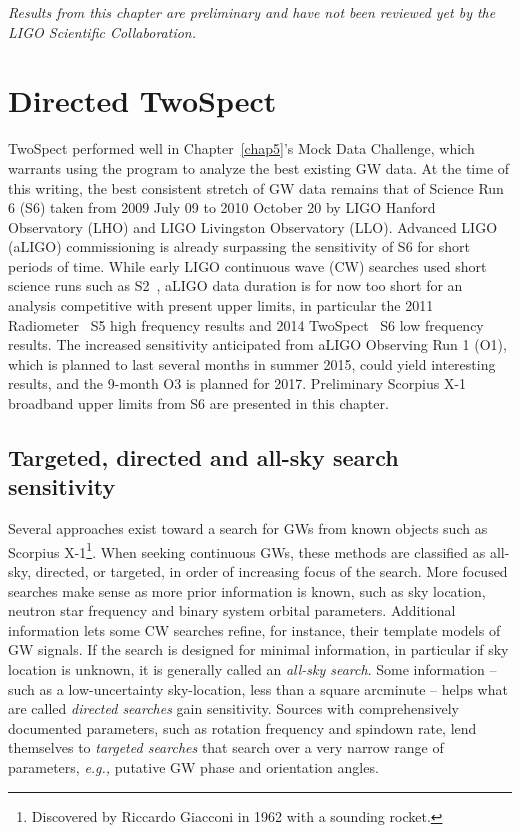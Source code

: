 
\textit{Results from this chapter are preliminary and have not been reviewed yet by the LIGO Scientific Collaboration.}

        \section{Directed TwoSpect}
        \label{directed}

TwoSpect performed well in Chapter~\ref{chap5}'s Mock Data Challenge, which warrants using the program to analyze the best existing GW data.
At the time of this writing, the best consistent stretch of GW data remains that of Science Run 6 (S6) taken from 2009 July 09 to 2010 October 20 by LIGO Hanford Observatory (LHO) and LIGO Livingston Observatory (LLO).
Advanced LIGO (aLIGO) commissioning is already surpassing the sensitivity of S6 for short periods of time.
While early LIGO continuous wave (CW) searches used short science runs such as S2~\cite{AbbottScoX12007}, aLIGO data duration is for now too short for an analysis competitive with present upper limits, in particular the 2011 Radiometer~\cite{AbadieStoch2011} S5 high frequency results and 2014 TwoSpect~\cite{GoetzTwoSpectResults2014} S6 low frequency results.
The increased sensitivity anticipated from aLIGO Observing Run 1 (O1), which is planned to last several months in summer 2015, could yield interesting results, and the 9-month O3 is planned for 2017.
Preliminary Scorpius X-1 broadband upper limits from S6 are presented in this chapter.


            \subsection{Targeted, directed and all-sky search sensitivity}
            \label{tradeoffs}

Several approaches exist toward a search for GWs from known objects such as Scorpius X-1\footnote{Discovered by Riccardo Giacconi in 1962 with a sounding rocket.}.
When seeking continuous GWs, these methods are classified as all-sky, directed, or targeted, in order of increasing focus of the search.
More focused searches make sense as more prior information is known, such as sky location, neutron star frequency and binary system orbital parameters.
Additional information lets some CW searches refine, for instance, their template models of GW signals.
If the search is designed for minimal information, in particular if sky location is unknown, it is generally called an \textit{all-sky search}.
Some information -- such as a low-uncertainty sky-location, less than a square arcminute -- helps what are called \textit{directed searches} gain sensitivity.
Sources with comprehensively documented parameters, such as rotation frequency and spindown rate, lend themselves to \textit{targeted searches} that search over a very narrow range of parameters, \textit{e.g.,} putative GW phase and orientation angles.


